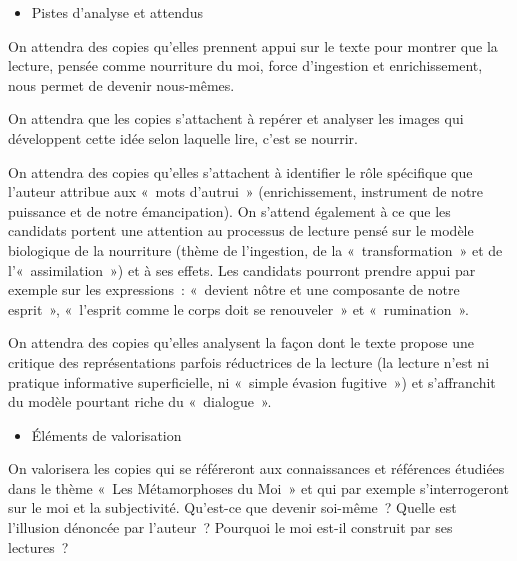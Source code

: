 {\begin{itemize}[label=\textbullet]
\item Pistes d'analyse et attendus
\end{itemize}

On attendra des copies qu'elles prennent appui sur le texte pour montrer que la lecture,
pensée comme nourriture du moi, force d'ingestion et enrichissement, nous permet de
devenir nous-mêmes.

On attendra que les copies s'attachent à repérer et analyser les images qui
développent cette idée selon laquelle lire, c'est se nourrir.

On attendra des copies qu'elles s'attachent à identifier le rôle spécifique que l'auteur
attribue aux «~mots d'autrui~» (enrichissement, instrument de notre puissance et de
notre émancipation). On s'attend également à ce que les candidats portent une
attention au processus de lecture pensé sur le modèle biologique de la nourriture
(thème de l'ingestion, de la «~transformation~» et de l'«~assimilation~») et à ses effets.
Les candidats pourront prendre appui par exemple sur les expressions~: «~devient
nôtre et une composante de notre esprit~», «~l'esprit comme le corps doit se
renouveler~» et «~rumination~».

On attendra des copies qu'elles analysent la façon dont le texte propose une critique
des représentations parfois réductrices de la lecture (la lecture n'est ni pratique
informative superficielle, ni «~simple évasion fugitive~») et s'affranchit du modèle
pourtant riche du «~dialogue~».

\begin{itemize}[label=\textbullet]
\item Éléments de valorisation
\end{itemize}

On valorisera les copies qui se référeront aux connaissances et références étudiées
dans le thème «~Les Métamorphoses du Moi~» et qui par exemple s'interrogeront sur
le moi et la subjectivité. Qu'est-ce que devenir soi-même~? Quelle est l'illusion
dénoncée par l'auteur~? Pourquoi le moi est-il construit par ses lectures~?

}
